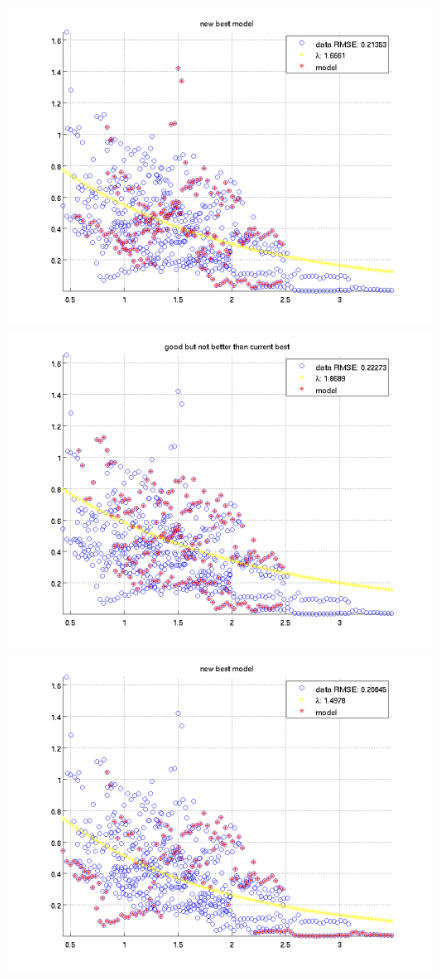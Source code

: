 \documentclass[12pt]{report}
\begin{document}
\begin{figure}[H]
\begin{minipage}[t]{0.5\linewidth}
\end{minipage}
\begin{minipage}[t]{0.5\linewidth}
	\centering
	\includegraphics[scale=\imFeatRan]{images/ransac8}\\
	\includegraphics[scale=\imFeatRan]{images/ransac10}\\
	\includegraphics[scale=\imFeatRan]{images/ransac12}\\

\end{minipage}
\end{figure}
\end{document}
